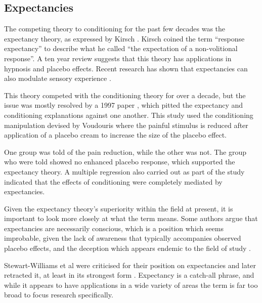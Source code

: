 \subsection{Expectancies}
\label{sec:expectancies}

The competing theory to conditioning for the past few decades was the expectancy theory, as expressed by Kirsch \cite{Kirsch1985}. Kirsch coined the term ``response expectancy'' to describe what he called ``the expectation of a non-volitional response''. A ten year review \cite{Kirsch1997}  suggests that this theory has applications in hypnosis and placebo effects. Recent research has shown that expectancies can also modulate sensory experience  \cite{Sterzer2008}. 

This theory competed with the conditioning theory for over a decade, but the issue was mostly resolved by a 1997 paper \cite{Montgomery1997}, which pitted the expectancy and conditioning explanations against one another. This study used the conditioning manipulation devised by Voudouris \cite{Voudouris1985} where the painful stimulus is reduced after application of a placebo cream to increase the size of the placebo effect. 

One group was told of the pain reduction, while the other was not. The group who were told showed no enhanced placebo response, which supported the expectancy theory. A multiple regression also carried out as part of the study indicated that the effects of conditioning were completely mediated by expectancies. 


Given the expectancy theory's superiority within the field at present, it is important to look more closely at what the term means. Some authors \cite{Stewart-Williams2004a}  argue that expectancies are necessarily conscious, which is a position which seems improbable, given the lack of awareness that typically accompanies observed placebo effects, and the deception which appears endemic to the field of study \cite{Miller2008a,Miller2008}.  

Stewart-Williams et al were criticised for their position on expectancies \cite{Kirsch2004}  and later retracted it, at least in its strongest form \cite{Stewart-Williams2004}. Expectancy is a catch-all phrase, and while it appears to have applications in a wide variety of areas \cite{Montgomery2007} the term is far too broad to focus research specifically. 

